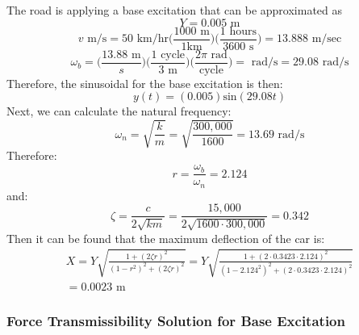 \documentclass[12pt,letter]{article}
\begin{document}
\begin{example}
			The road is applying a base excitation that can be approximated as 
			\begin{equation}
				Y = 0.005 \text{ m}
			\end{equation} 				
			\begin{equation}
				v \text{ m/s} = 50 \text{ km/hr}\Bigg(\frac{1000 \text{ m}}{1 \text {km}}\Bigg) \Bigg(\frac{1 \text{ hours}}{3600 \text { s}}\Bigg) = 13.888 \text{ m/sec}
			\end{equation} 	
			\begin{equation}
				\omega_b = \Bigg(\frac{ 13.88 \text{ m}}{s}\Bigg) \Bigg(\frac{ 1 \text{ cycle}}{3 \text{ m}}\Bigg) \Bigg(\frac{ 2 \pi \text{ rad}}{\text {cycle}}\Bigg) = \text{ rad/s} = 29.08 \text{ rad/s} 
			\end{equation} 	
			Therefore, the sinusoidal for the base excitation is then:
			\begin{equation}
				y(t) = (0.005) \text{sin}(29.08 t)
			\end{equation} 	
			Next, we can calculate the natural frequency:
			\begin{equation}
				\omega_n = \sqrt{\frac{k}{m}} = \sqrt{\frac{300,000}{1600}} = 13.69 \text{ rad/s}
			\end{equation} 			
			Therefore:
			\begin{equation}
			r=\frac{\omega_b}{\omega_n}  = 2.124
			\end{equation} 		
			and:
			\begin{equation}
			\zeta = \frac{c}{2\sqrt{km}}= \frac{15,000}{2\sqrt{1600\cdot300,000}} = 0.342
			\end{equation}	
			Then it can be found that the maximum deflection of the car is:
			\begin{equation}
			\begin{split}
			X = Y \sqrt{\frac{1+(2 \zeta r)^2}{(1-r^2)^2 + (2 \zeta r )^2}} = Y \sqrt{\frac{1+(2 \cdot 0.3423 \cdot2.124)^2}{(1-2.124^2)^2 + (2 \cdot 0.3423 \cdot 2.124 )^2}}  \\ = 0.0023 \text{ m}
			\end{split}
			\end{equation} 		
		\end{example}	
			
	\subsubsection{Force Transmissibility Solution for Base Excitation}
	
\end{document}
